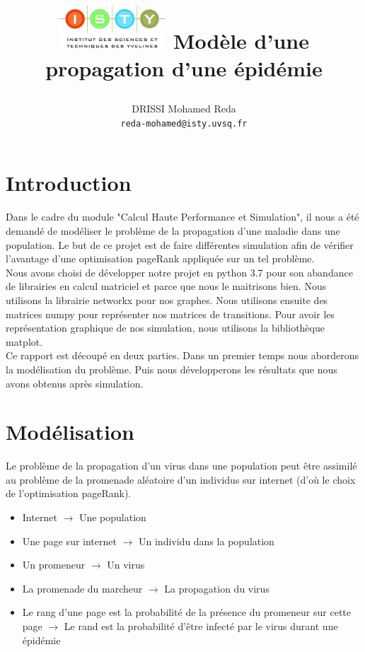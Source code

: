 \documentclass{report}
\begin{document}
\title{
  \begin{minipage}\linewidth
      \centering
      \includegraphics[width=40mm]{resources/01.png}\vskip 20pt
      Modèle d’une propagation d’une épidémie
      \vskip 5pt
      \author{
        DRISSI Mohamed Reda \\
        \texttt{reda-mohamed@isty.uvsq.fr}
      }
    \end{minipage}
}
\maketitle
\newpage
\tableofcontents
\newpage
\section{Introduction}
Dans le cadre du module "Calcul Haute Performance et Simulation", il nous a été demandé de modéliser
le problème de la propagation d’une maladie dans une population. Le but de ce projet est de faire
différentes simulation afin de vérifier l'avantage d'une optimisation pageRank appliquée sur un
tel problème.\\

Nous avons choisi de développer notre projet en python 3.7 pour son abandance de librairies en calcul
matriciel et parce que nous le maitrisons bien. Nous utilisons la librairie networkx pour nos graphes.
Nous utilisons ensuite des matrices numpy pour représenter nos matrices de transitions.
Pour avoir les représentation graphique de nos simulation, nous utilisons la bibliothèque matplot.\\

Ce rapport est découpé en deux parties. Dans un premier temps nous aborderons la modélisation du problème.
Puis nous développerons les résultats que nous avons obtenus après simulation.
\section{Modélisation}
Le problème de la propagation d’un virus dans une population peut être assimilé au problème
de la promenade aléatoire d’un individus sur internet (d'où le choix de l'optimisation pageRank).
\vspace{3mm}
\begin{itemize}[label=$\bullet$]
  \item Internet $\rightarrow$ Une population
  \item Une page sur internet $\rightarrow$ Un individu dans la population
  \item Un promeneur $\rightarrow$ Un virus
  \item La promenade du marcheur $\rightarrow$ La propagation du virus
  \item Le rang d’une page est la probabilité de la présence du promeneur sur cette page $\rightarrow$
    Le rand est la probabilité d’être infecté par le virus durant une épidémie
\end{itemize}
\newpage
\end{document}
